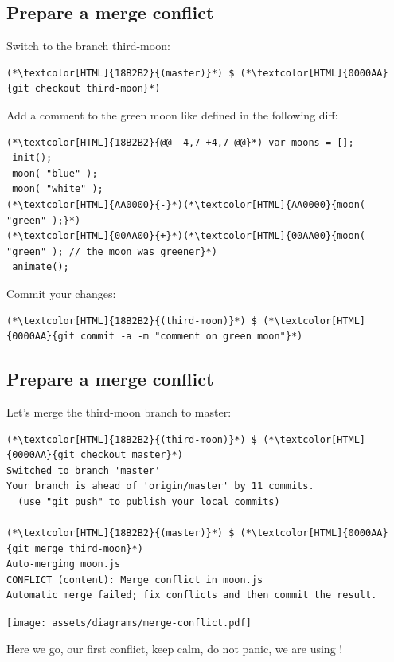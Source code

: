\subsection{Prepare a merge conflict}
\begin{frame}[fragile]
  \subslidetitle

  Switch to the branch third-moon:
  \begin{lstlisting}
(*\textcolor[HTML]{18B2B2}{(master)}*) $ (*\textcolor[HTML]{0000AA}{git checkout third-moon}*)
\end{lstlisting}

  Add a comment to the green moon like defined in the following diff:
  \begin{lstlisting}
(*\textcolor[HTML]{18B2B2}{@@ -4,7 +4,7 @@}*) var moons = [];
 init();
 moon( "blue" );
 moon( "white" );
(*\textcolor[HTML]{AA0000}{-}*)(*\textcolor[HTML]{AA0000}{moon( "green" );}*)
(*\textcolor[HTML]{00AA00}{+}*)(*\textcolor[HTML]{00AA00}{moon( "green" ); // the moon was greener}*)
 animate();
\end{lstlisting}

  Commit your changes:
  \begin{lstlisting}
(*\textcolor[HTML]{18B2B2}{(third-moon)}*) $ (*\textcolor[HTML]{0000AA}{git commit -a -m "comment on green moon"}*)
\end{lstlisting}
\end{frame}

\subsection{Prepare a merge conflict}
\begin{frame}[fragile]
  \subslidetitle

  Let's merge the third-moon branch to master:
  \begin{lstlisting}
(*\textcolor[HTML]{18B2B2}{(third-moon)}*) $ (*\textcolor[HTML]{0000AA}{git checkout master}*)
Switched to branch 'master'
Your branch is ahead of 'origin/master' by 11 commits.
  (use "git push" to publish your local commits)

(*\textcolor[HTML]{18B2B2}{(master)}*) $ (*\textcolor[HTML]{0000AA}{git merge third-moon}*)
Auto-merging moon.js
CONFLICT (content): Merge conflict in moon.js
Automatic merge failed; fix conflicts and then commit the result.
\end{lstlisting}
  \centerline{\texttt{[image: assets/diagrams/merge-conflict.pdf]}}
  \vspace{0.5em}
  Here we go, our first conflict, keep calm, do not panic, we are using !
\end{frame}

